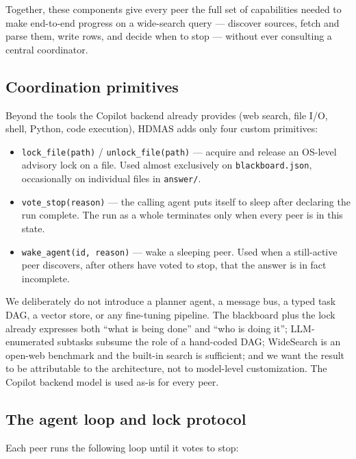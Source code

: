 \documentclass[11pt]{article}
\newcommand{\code}[1]{\texttt{#1}}
\begin{document}
Together, these components give every peer the full set of capabilities needed to make end-to-end progress on a wide-search query --- discover sources, fetch and parse them, write rows, and decide when to stop --- without ever consulting a central coordinator.

\subsection{Coordination primitives}

Beyond the tools the Copilot backend already provides (web search, file I/O, shell, Python, code execution), HDMAS adds only four custom primitives:

\begin{itemize}[leftmargin=1.2em]
  \item \code{lock\_file(path)} / \code{unlock\_file(path)} --- acquire and release an OS-level advisory lock on a file. Used almost exclusively on \code{blackboard.json}, occasionally on individual files in \code{answer/}.
  \item \code{vote\_stop(reason)} --- the calling agent puts itself to sleep after declaring the run complete. The run as a whole terminates only when every peer is in this state.
  \item \code{wake\_agent(id, reason)} --- wake a sleeping peer. Used when a still-active peer discovers, after others have voted to stop, that the answer is in fact incomplete.
\end{itemize}

We deliberately do not introduce a planner agent, a message bus, a typed task DAG, a vector store, or any fine-tuning pipeline. The blackboard plus the lock already expresses both ``what is being done'' and ``who is doing it''; LLM-enumerated subtasks subsume the role of a hand-coded DAG; WideSearch is an open-web benchmark and the built-in search is sufficient; and we want the result to be attributable to the architecture, not to model-level customization. The Copilot backend model is used as-is for every peer.

\subsection{The agent loop and lock protocol}

Each peer runs the following loop until it votes to stop:
\end{document}
